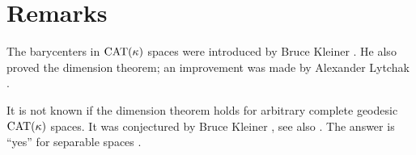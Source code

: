 \section{Remarks}

The barycenters in $\mathrm{CAT}(\kappa)$ spaces were introduced by Bruce Kleiner \cite{kleiner}.
He also proved the dimension theorem; an improvement was made by Alexander Lytchak \cite{lytchak:diff}.

It is not known if the dimension theorem holds for arbitrary complete geodesic $\mathrm{CAT}(\kappa)$ spaces.
It was conjectured by Bruce Kleiner \cite{kleiner}, see also \cite[p.~133]{gromov:asymt-inv}.
The answer is ``yes'' for separable spaces \cite[Corollary 14.13]{alexander-kapovitch-petrunin-2025}.


